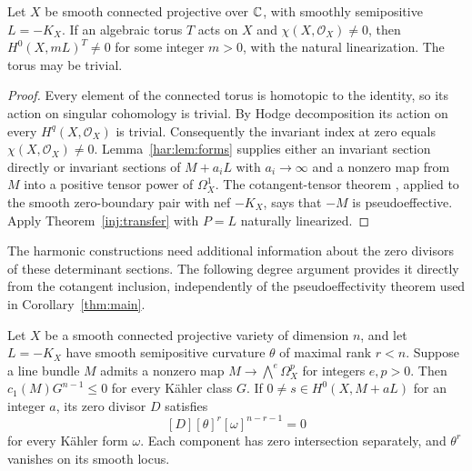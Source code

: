 \begin{corollary}\label{thm:main}
Let $X$ be smooth connected projective over $\mathbb C$, with smoothly semipositive $L=-K_X$. If an algebraic torus $T$ acts on $X$ and $\chi(X,\mathcal O_X)\ne0$, then $H^0(X,mL)^T\ne0$ for some integer $m>0$, with the natural linearization. The torus may be trivial.
\end{corollary}
\begin{proof}
Every element of the connected torus is homotopic to the identity, so its action on singular cohomology is trivial. By Hodge decomposition its action on every $H^q(X,\mathcal O_X)$ is trivial. Consequently the invariant index at zero equals $\chi(X,\mathcal O_X)\ne0$.
Lemma~\ref{har:lem:forms} supplies either an invariant section directly or invariant sections of $M+a_iL$ with $a_i\to\infty$ and a nonzero map from $M$ into a positive tensor power of $\Omega_X^1$. The cotangent-tensor theorem \cite[Theorem~4.1]{LMPTX2023}, applied to the smooth zero-boundary pair with nef $-K_X$, says that $-M$ is pseudoeffective. Apply Theorem~\ref{inj:transfer} with $P=L$ naturally linearized.
\end{proof}

The harmonic constructions need additional information about the zero
divisors of these determinant sections. The following degree argument
provides it directly from the cotangent inclusion, independently of the
pseudoeffectivity theorem used in Corollary~\ref{thm:main}.

\begin{lemma}\label{har:lem:null-divisors}
Let $X$ be a smooth connected projective variety of dimension $n$, and
let $L=-K_X$ have smooth semipositive curvature $\theta$ of maximal
rank $r<n$. Suppose a line bundle $M$ admits a nonzero map
$M\to\bigwedge^e\Omega_X^p$ for integers $e,p>0$. Then
$c_1(M)G^{n-1}\le0$ for every Kähler class $G$. If
$0\ne s\in H^0(X,M+aL)$ for an integer $a$, its zero divisor $D$
satisfies
\[
 [D][\theta]^r[\omega]^{n-r-1}=0
\]
for every Kähler form $\omega$. Each component has zero intersection
separately, and $\theta^r$ vanishes on its smooth locus.
\end{lemma}

